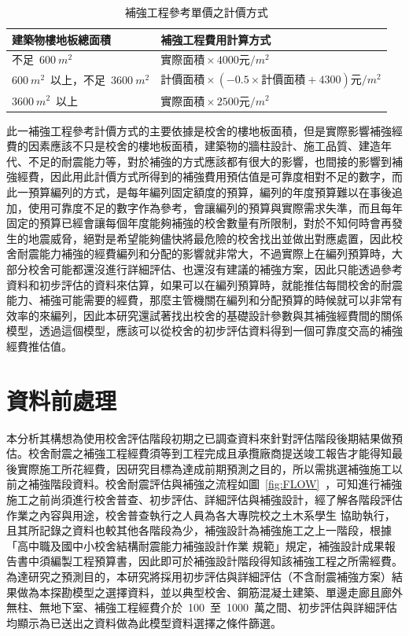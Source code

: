 \setlength{\tabcolsep}{1em}
\begin{table}[hbtp]
  \begin{center}
    \caption{補強工程參考單價之計價方式}
    \label{tab:cost_result_table}
    \begin{tabular}{l l}
      \hline
      建築物樓地板總面積 & 補強工程費用計算方式 \\
      \hline
      不足~$600~m^2$ & $\text{實際面積} \times 4000 \text{元}/m^2$ \\
      $600~m^2$~以上，不足~$3600~m^2$ & $\text{計價面積} \times (-0.5 \times \text{計價面積} + 4300) \text{元}/m^2$ \\
      $3600~m^2$~以上 & $\text{實際面積} \times 2500 \text{元}/m^2$ \\
      \hline
      \end{tabular}
  \end{center}
\end{table}

此一補強工程參考計價方式的主要依據是校舍的樓地板面積，但是實際影響補強經費的因素應該不只是校舍的樓地板面積，建築物的牆柱設計、施工品質、建造年代、不足的耐震能力等，對於補強的方式應該都有很大的影響，也間接的影響到補強經費，因此用此計價方式所得到的補強費用預估值是可靠度相對不足的數字，而此一預算編列的方式，是每年編列固定額度的預算，編列的年度預算難以在事後追加，使用可靠度不足的數字作為參考，會讓編列的預算與實際需求失準，而且每年固定的預算已經會讓每個年度能夠補強的校舍數量有所限制，對於不知何時會再發生的地震威脅，絕對是希望能夠儘快將最危險的校舍找出並做出對應處置，因此校舍耐震能力補強的經費編列和分配的影響就非常大，不過實際上在編列預算時，大部分校舍可能都還沒進行詳細評估、也還沒有建議的補強方案，因此只能透過參考資料和初步評估的資料來估算，如果可以在編列預算時，就能推估每間校舍的耐震能力、補強可能需要的經費，那麼主管機關在編列和分配預算的時候就可以非常有效率的來編列，因此本研究還試著找出校舍的基礎設計參數與其補強經費間的關係模型，透過這個模型，應該可以從校舍的初步評估資料得到一個可靠度交高的補強經費推估值。


\section{資料前處理}

本分析其構想為使用校舍評估階段初期之已調查資料來針對評估階段後期結果做預估。校舍耐震之補強工程經費須等到工程完成且承攬廠商提送竣工報告才能得知最後實際施工所花經費，因研究目標為達成前期預測之目的，所以需挑選補強施工以前之補強階段資料。校舍耐震評估與補強之流程如圖~\ref{fig:FLOW}~，可知進行補強施工之前尚須進行校舍普查、初步評估、詳細評估與補強設計，經了解各階段評估作業之內容與用途，校舍普查執行之人員為各大專院校之土木系學生 協助執行，且其所記錄之資料也較其他各階段為少，補強設計為補強施工之上一階段，根據「高中職及國中小校舍結構耐震能力補強設計作業 規範」規定，補強設計成果報告書中須編製工程預算書，因此即可於補強設計階段得知該補強工程之所需經費。為達研究之預測目的，本研究將採用初步評估與詳細評估（不含耐震補強方案）結果做為本探勘模型之選擇資料，並以典型校舍、鋼筋混凝土建築、單邊走廊且廊外無柱、無地下室、補強工程經費介於~100~至~1000~萬之間、初步評估與詳細評估均顯示為已送出之資料做為此模型資料選擇之條件篩選。

